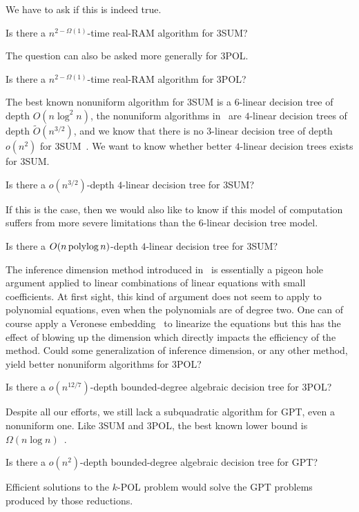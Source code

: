 We have to ask if this is indeed true.
\begin{openquestion}
	Is there a \(n^{2-\Omega(1)}\)-time real-RAM algorithm for 3SUM?
\end{openquestion}

The question can also be asked more generally for 3POL.
\begin{openquestion}
	Is there a \(n^{2-\Omega(1)}\)-time real-RAM algorithm for 3POL?
\end{openquestion}

The best known nonuniform algorithm for 3SUM is a \(6\)-linear decision tree of
depth \(O(n \log^2 n)\), the nonuniform algorithms in~\cite{GP18,Fr15,GS15} are
\(4\)-linear decision trees of depth \( \tilde{O}(n^{3/2}) \), and we know that
there is no \(3\)-linear decision tree of depth \(o(n^2)\) for
3SUM~\cite{Er99a}.
We want to know whether better \(4\)-linear decision trees exists for 3SUM.
\begin{openquestion}
	Is there a \(o(n^{3/2})\)-depth \(4\)-linear decision tree for 3SUM?
\end{openquestion}

If this is the case, then we would also like to know if this model of
computation suffers from more severe limitations than the \(6\)-linear decision tree
model.
\begin{openquestion}
	Is there a \(O(n \operatorname{polylog} n)\)-depth \(4\)-linear decision tree for 3SUM?
\end{openquestion}

The inference dimension method introduced in~\cite{KLM18} is essentially a
pigeon hole argument applied to linear combinations of linear equations with small coefficients.
At first sight, this kind of argument does not seem to apply to polynomial
equations, even when the polynomials are of degree two. One can of course apply
a Veronese embedding~\cite{Har77,Har13} to linearize the equations but this has
the effect of blowing up the dimension which directly impacts the efficiency of
the method. Could some generalization of inference dimension, or any other
method, yield better nonuniform algorithms for 3POL?
\begin{openquestion}
	Is there a \(o(n^{12/7})\)-depth bounded-degree algebraic decision tree for
	3POL?
\end{openquestion}

Despite all our efforts, we still lack a subquadratic algorithm for GPT, even a
nonuniform one. Like 3SUM and 3POL, the best known lower bound is \(\Omega(n
\log n)\)~\cite{???}.
\begin{openquestion}
	Is there a \(o(n^2)\)-depth bounded-degree algebraic decision tree for
	GPT?
\end{openquestion}


Efficient solutions to the $k$-POL problem
would solve the GPT problems produced by those reductions.

